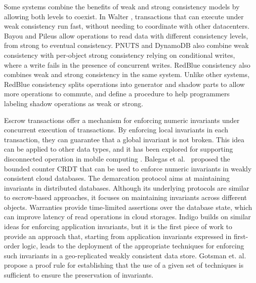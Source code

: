 Some systems combine the benefits of weak and strong consistency models by allowing both levels to coexist. 
In Walter \cite{walter}, transactions that can execute under weak consistency run fast, without needing to coordinate with other datacenters.
Bayou \cite{bayou} and Pileus \cite{Pileus} allow operations to read data with different consistency levels, from strong to eventual consistency.
PNUTS \cite{pnuts} and DynamoDB \cite{dynamoDB} also combine weak consistency with per-object strong consistency relying on conditional writes, where a write fails in the presence of concurrent writes.
RedBlue consistency also combines weak and strong consistency in the same system. 
Unlike other systems, RedBlue consistency splits operations into
generator and shadow parts to allow more 
operations to commute, and define a procedure to help programmers labeling shadow operations 
as weak or strong.

Escrow transactions \cite{ONeil1986Escrow} offer a mechanism for
enforcing numeric invariants under concurrent execution of transactions.
By enforcing local invariants in each transaction, they can guarantee that a
global invariant is not broken.
This  idea can be applied to other data types, and it has been 
explored for supporting disconnected operation
in mobile computing \cite{Walborn95Semantics,mobisnap,exo-leasing}.
Balegas et al.~\cite{Balegas2015Counter} proposed the bounded counter CRDT
that can be used to enforce numeric invariants in weakly consistent cloud
databases.
The demarcation protocol \cite{BarbaraMilla1994Demarcation} aims at maintaining invariants
in distributed databases. 
Although its underlying protocols are similar to escrow-based 
approaches, it focuses on maintaining invariants across different objects.
Warranties \cite{warranties} provide time-limited assertions over the database state, which can improve latency of read operations in cloud storages.
Indigo builds on similar ideas for enforcing application invariants, 
but it is the first piece of work
to provide an approach that, starting from application invariants expressed in first-order
logic, leads to the deployment of the appropriate techniques for enforcing such 
invariants in a geo-replicated weakly consistent data store. 
Gotsman et. al. \cite{GotsmanConsistencyReason} propose a proof rule 
for establishing that the use of a given set of techniques is
sufficient to ensure the preservation of invariants.

